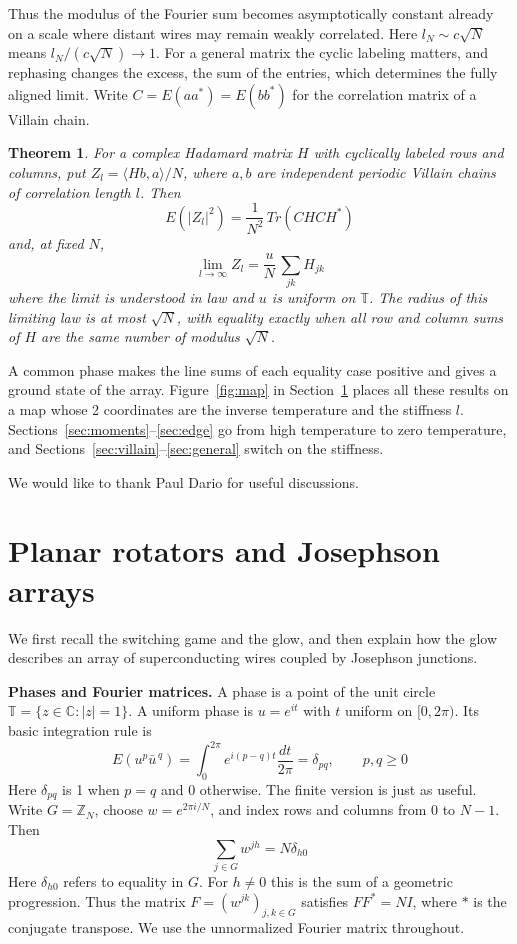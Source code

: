 \documentclass[11pt,a4paper]{article}
\newtheorem{introthm}{Theorem}
\theoremstyle{remark}
\begin{document}
Thus the modulus of the Fourier sum becomes asymptotically constant already on a scale where distant wires may remain weakly correlated. Here $l_N\sim c\sqrt N$ means $l_N/(c\sqrt N)\to1$. For a general matrix the cyclic labeling matters, and rephasing changes the excess, the sum of the entries, which determines the fully aligned limit. Write $C=E(aa^*)=E(bb^*)$ for the correlation matrix of a Villain chain.

\begin{samepage}
\begin{introthm}\label{intro:general}
For a complex Hadamard matrix $H$ with cyclically labeled rows and columns, put $Z_l=\langle Hb,a\rangle/N$, where $a,b$ are independent periodic Villain chains of correlation length $l$. Then
\[
 E(|Z_l|^2)=\frac1{N^2}\,Tr(CHCH^*)
\]
and, at fixed $N$,
\[
 \lim_{l\to\infty}Z_l=\frac{u}{N}\,\sum_{jk}H_{jk}
\]
where the limit is understood in law and $u$ is uniform on $\mathbb T$. The radius of this limiting law is at most $\sqrt N$, with equality exactly when all row and column sums of $H$ are the same number of modulus $\sqrt N$.
\end{introthm}
\end{samepage}

A common phase makes the line sums of each equality case positive and gives a ground state of the array. Figure~\ref{fig:map} in Section~\ref{sec:glow} places all these results on a map whose 2 coordinates are the inverse temperature and the stiffness $l$. Sections~\ref{sec:moments}--\ref{sec:edge} go from high temperature to zero temperature, and Sections~\ref{sec:villain}--\ref{sec:general} switch on the stiffness.

 We would like to thank Paul Dario for useful discussions.

\section{Planar rotators and Josephson arrays}\label{sec:glow}

We first recall the switching game and the glow, and then explain how the glow describes an array of superconducting wires coupled by Josephson junctions.

\medskip

\noindent\textbf{Phases and Fourier matrices.} 
A phase is a point of the unit circle $\mathbb T=\{z\in\mathbb C:|z|=1\}$. A uniform
phase is $u=e^{it}$ with $t$ uniform on $[0,2\pi)$. Its basic integration
rule is
\[
 E(u^p\bar u^{\,q})=\int_0^{2\pi}e^{i(p-q)t}\frac{dt}{2\pi}
 =\delta_{pq},\qquad p,q\geq 0
\]
Here $\delta_{pq}$ is 1 when $p=q$ and 0 otherwise. The finite version is just as useful. Write $G=\mathbb Z_N$, choose
$w=e^{2\pi i/N}$, and index rows and columns from $0$ to $N-1$. Then
\[
  \sum_{j\in G}w^{jh}=N\delta_{h0}
\]
Here $\delta_{h0}$ refers to equality in $G$. For $h\ne 0$ this is the sum of a geometric progression. Thus the matrix
$F=(w^{jk})_{j,k\in G}$ satisfies $FF^*=NI$, where $*$ is the conjugate
transpose. We use the unnormalized Fourier matrix throughout.
\end{document}
